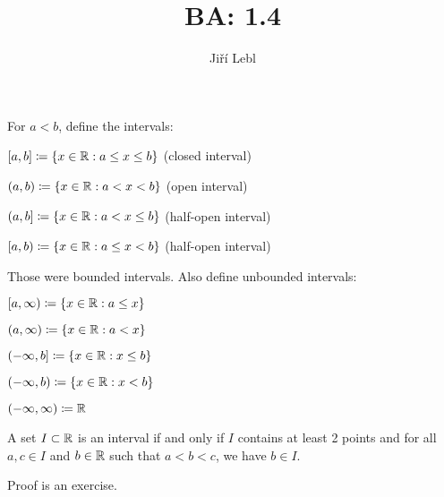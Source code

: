 \documentclass[10pt,aspectratio=149]{beamer}
\author{Ji\v{r}\'i Lebl}
\institute[OSU]{%
Departemento pri Matematiko de Oklahoma {\^S}tata Universitato}
\title{BA: 1.4}
\date{}
\begin{document}
\begin{frame}
\titlepage
\end{frame}

\begin{frame}
For $a < b$, define the intervals:

\medskip
\pause

$[a,b] \coloneqq \{ x \in {\mathbb{R}} : a \leq x \leq b \}$
\quad (closed interval)

\pause

$(a,b) \coloneqq \{ x \in {\mathbb{R}} : a < x < b \}$
\quad (open interval)

\pause

$(a,b] \coloneqq \{ x \in {\mathbb{R}} : a < x \leq b \}$
\quad (half-open interval)

\pause

$[a,b) \coloneqq \{ x \in {\mathbb{R}} : a \leq x < b \}$
\quad (half-open interval)

\pause
\medskip

Those were bounded intervals.  Also define unbounded intervals:

\medskip
\pause

$[a,\infty) \coloneqq \{ x \in {\mathbb{R}} : a \leq x \}$

\pause

$(a,\infty) \coloneqq \{ x \in {\mathbb{R}} : a < x \}$

\pause

$(-\infty,b] \coloneqq \{ x \in {\mathbb{R}} : x \leq b \}$

\pause

$(-\infty,b) \coloneqq \{ x \in {\mathbb{R}} : x < b \}$

\pause

$(-\infty,\infty) \coloneqq {\mathbb{R}}$

\pause

\begin{proposition}
A set $I \subset {\mathbb{R}}$ is an interval if and only if
$I$ contains at least 2 points and
for all $a,c \in I$ and $b \in {\mathbb{R}}$ such that $a < b < c$, we have $b \in I$.
\end{proposition}

\pause

Proof is an exercise.

\end{frame}
\end{document}
